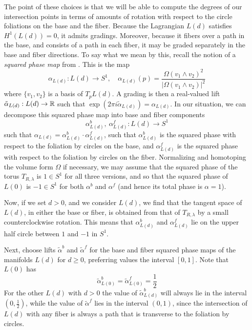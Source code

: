 \documentclass[12pt]{amsart}
\begin{document}
The point of these choices is that we will be able to compute the degrees of our intersection points in terms of amounts of rotation with respect to the circle foliations on the base and the fiber. Because the Lagrangian $L(d)$ satisfies $H^1(L(d)) = 0$, it admits gradings. Moreover, because it fibers over a path in the base, and consists of a path in each fiber, it may be graded separately in the base and fiber directions. To say what we mean by this, recall the notion of a \emph{squared phase map} from \cite{seidel-book}. This is the map
\begin{equation}
  \alpha_{L(d)} : L(d) \to S^1, \quad \alpha_{L(d)}(p) = \frac{\Omega(v_1\wedge v_2)^2}{|\Omega(v_1\wedge v_2)|^2}
\end{equation}
where $\{v_1, v_2\}$ is a basis of $T_pL(d)$. A grading is then a real-valued lift $\tilde{\alpha}_{L(d)}: L(d) \to \mathbb{R}$ such that $\exp(2\pi i \tilde{\alpha}_{L(d)}) = \alpha_{L(d)}$. In our situation, we can decompose this squared phase map into base and fiber components
\begin{equation}
  \alpha_{L(d)}^b,\  \alpha_{L(d)}^f : L(d) \to S^1
\end{equation}
such that $\alpha_{L(d)} = \alpha_{L(d)}^b\cdot \alpha_{L(d)}^f$, such that $\alpha_{L(d)}^b$ is the squared phase with respect to the foliation by circles on the base, and $\alpha_{L(d)}^f$ is the squared phase with respect to the foliation by circles on the fiber. Normalizing and homotoping the volume form $\Omega$ if necessary, we may assume that the squared phase of the torus $T_{R,\lambda}$ is $1 \in S^1$ for all three versions, and so that the squared phase of $L(0)$ is $-1 \in S^1$ for both $\alpha^b$ and $\alpha^f$ (and hence its total phase is $\alpha = 1$). 

Now, if we set $d > 0$, and we consider $L(d)$, we find that the tangent space of $L(d)$, in either the base or fiber, is obtained from that of $T_{R,\lambda}$ by a small counterclockwise rotation. This means that $\alpha_{L(d)}^b$ and $\alpha_{L(d)}^f$ lie on the upper half circle between $1$ and $-1$ in $S^1$. 

Next, choose lifts $\tilde{\alpha}^b$ and $\tilde{\alpha}^f$ for the base and fiber squared phase maps of the manifolds $L(d)$ for $d \geq 0$, preferring values the interval $[0,1]$. Note that $L(0)$ has 
\begin{equation}
\tilde{\alpha}_{L(0)}^b = \tilde{\alpha}_{L(0)}^f = \frac{1}{2}  
\end{equation}
For the other $L(d)$ with $d > 0$ the value of $\tilde{\alpha}_{L(d)}^b$ will always lie in the interval $(0,\frac{1}{2})$, while the value of $\tilde{\alpha}^f$ lies in the interval $(0,1)$, since the intersection of $L(d)$ with any fiber is always a path that is transverse to the foliation by circles. 
\end{document}
